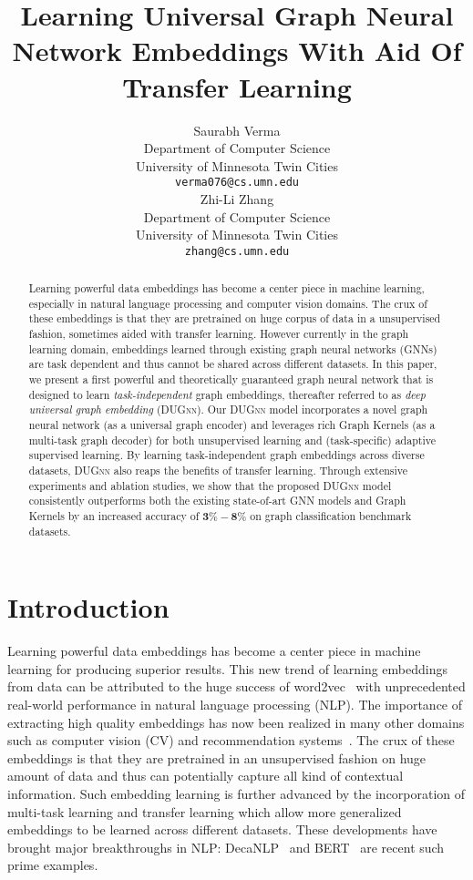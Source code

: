 \documentclass{article}
\title{Learning Universal Graph Neural Network Embeddings With Aid Of Transfer Learning}
\author{Saurabh Verma \\
  Department of Computer Science\\
  University of Minnesota Twin Cities\\
  \texttt{verma076@cs.umn.edu} \\
\And
   Zhi-Li Zhang \\
  Department of Computer Science\\
University of Minnesota Twin Cities\\
\texttt{zhang@cs.umn.edu} \\
}
\begin{document}
\maketitle

\begin{abstract}

Learning powerful data embeddings has become a center piece in machine learning,  especially in natural language processing  and computer vision  domains. The crux of these embeddings is that they are pretrained  on huge corpus of data in a unsupervised fashion, sometimes aided with transfer learning. However currently in the graph learning domain, embeddings learned through existing graph  neural networks (GNNs) are  task dependent and  thus cannot be shared across different datasets. In this paper, we present a  first powerful and theoretically guaranteed graph neural network that is designed to learn {\em task-independent} graph embeddings,  thereafter referred to as {\em deep  universal graph embedding} (\textsc{DUGnn}). Our \textsc{DUGnn}  model 
incorporates a novel graph neural network (as a universal graph encoder) and leverages rich Graph Kernels (as a multi-task graph decoder) for both unsupervised learning and (task-specific) adaptive supervised learning. 
By learning task-independent graph embeddings across diverse datasets, \textsc{DUGnn} also reaps the benefits of transfer learning. 
Through extensive experiments and ablation studies, we show that the proposed \textsc{DUGnn}  model consistently outperforms both the existing state-of-art GNN models and Graph Kernels by an increased accuracy of $\mathbf{3\textbf{\%}-8\textbf{\%}}$ on graph classification benchmark datasets.

\end{abstract}




\section{Introduction}

Learning powerful data embeddings   has become a center piece in machine learning for producing superior results. This new trend of learning embeddings from data can be attributed to the  huge success  of word2vec~\cite{mikolov2013distributed, pennington2014glove}  with unprecedented  real-world performance in natural language processing (NLP). The importance of  extracting high quality  embeddings has now been  realized   in many other domains such as computer vision (CV)  and recommendation systems~\cite{kiela2014learning, karpathy2014deep, zhang2016collaborative}. The crux of these embeddings is that they are  pretrained  in an unsupervised fashion on huge amount of data  and thus can potentially capture all kind of contextual information. Such embedding learning is further advanced by the incorporation of multi-task learning and transfer learning which allow more generalized embeddings to be learned across different datasets. These developments have brought major breakthroughs in NLP: DecaNLP~\cite{mccann2018natural} and BERT~\cite{devlin2018bert} are  recent such prime examples. 
\end{document}

